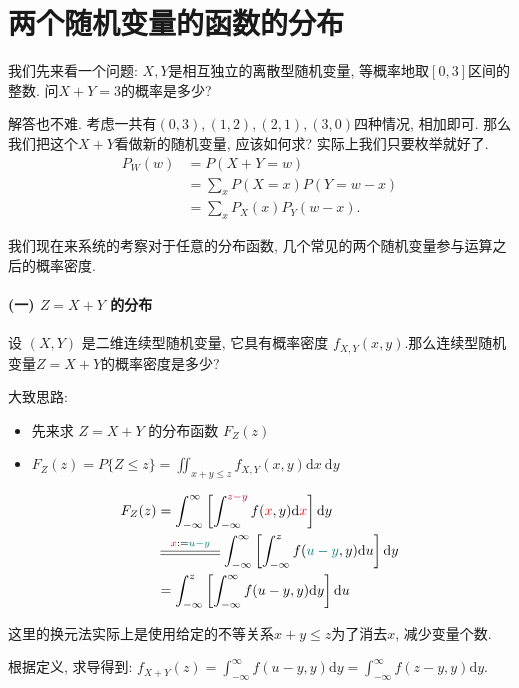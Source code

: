 \section{两个随机变量的函数的分布}

我们先来看一个问题: $X,Y$是相互独立的离散型随机变量, 等概率地取$[0,3]$区间的整数. 问$X+Y=3$的概率是多少? 

解答也不难. 考虑一共有$(0, 3), (1, 2), (2, 1), (3, 0)$四种情况, 相加即可. 那么我们把这个$X+Y$看做新的随机变量, 应该如何求? 实际上我们只要枚举就好了.
$$
\begin{aligned}
P_W(w) & =P(X+Y=w) \\
& =\sum_x P(X=x)  P(Y=w-x) \\
& =\sum_x P_X(x) P_Y(w-x) . 
\end{aligned}
$$

我们现在来系统的考察对于任意的分布函数, 几个常见的两个随机变量参与运算之后的概率密度. 

\paragraph{(一) $Z=X+Y$ 的分布}

设 $(X, Y)$ 是二维连续型随机变量, 它具有概率密度 $f_{X,Y}(x, y)$.那么连续型随机变量$Z=X+Y$的概率密度是多少?

大致思路: 
    \begin{itemize}
        \item 先来求 $Z=X+Y$ 的分布函数 $F_Z(z)$
        \item $F_Z(z)=P\{Z \leq z\}=\iint_{x+y \leq z} f_{X,Y}(x, y) \mathrm{d} x \mathrm{~d} y$
    \end{itemize}
    $$\begin{aligned}
        F_Z(z)&=\int_{-\infty}^{\infty}\left[\int_{-\infty}^{\purple {z-y}} f({\red{x}}, y) \mathrm{d} {\red{x}}\right] \mathrm{d} y \\ 
        &\stackrel{{\red x}:=\teal{u-y}}{\stackrel{\rule{1.5cm}{0.4pt}}{\rule{1.5cm}{0.4pt}}}
        \int_{-\infty}^{\infty}\left[\int_{-\infty}^z f({\teal {u-y}}, y) \mathrm{d} u\right] \mathrm{d} y\\
        &=\int_{-\infty}^z\left[\int_{-\infty}^{\infty} f(u-y, y) \mathrm{d} y\right] \mathrm{d} u
    \end{aligned}$$

    这里的换元法实际上是使用给定的不等关系$x+y\leq z$为了消去$x$, 减少变量个数. 

    根据定义, 求导得到: 
    $f_{X+Y}(z)=\int_{-\infty}^{\infty} f(u-y, y) \mathrm{d} y=\int_{-\infty}^{\infty} f(z-y, y) \mathrm{d} y.$

